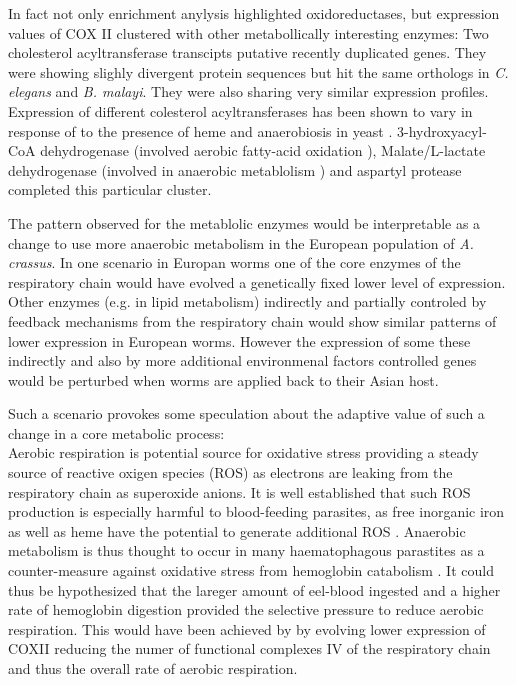 In fact not only enrichment anylysis highlighted oxidoreductases, but
expression values of COX II clustered with other metabollically
interesting enzymes: Two cholesterol acyltransferase transcipts
putative recently duplicated genes. They were showing slighly
divergent protein sequences but hit the same orthologs in
\textit{C. elegans} and \textit{B. malayi}. They were also sharing
very similar expression profiles. Expression of different colesterol
acyltransferases has been shown to vary in response of to the presence
of heme and anaerobiosis in yeast
\cite{pmid11786267}. 3-hydroxyacyl-CoA dehydrogenase (involved aerobic
fatty-acid oxidation \cite{pmid8454629}), Malate/L-lactate
dehydrogenase (involved in anaerobic metablolism
\cite{sturm1969vergleichende}) and aspartyl protease completed this
particular cluster.

The pattern observed for the metablolic enzymes would be interpretable
as a change to use more anaerobic metabolism in the European
population of \textit{A. crassus}. In one scenario in Europan worms
one of the core enzymes of the respiratory chain would have evolved a
genetically fixed lower level of expression. Other enzymes (e.g. in
lipid metabolism) indirectly and partially controled by feedback
mechanisms from the respiratory chain would show similar patterns of
lower expression in European worms. However the expression of some
these indirectly and also by more additional environmenal factors
controlled genes would be perturbed when worms are applied back to
their Asian host.


Such a scenario provokes some speculation about the adaptive value of
such a change in a core metabolic process:\\
Aerobic respiration is potential source for oxidative stress providing
a steady source of reactive oxigen species (ROS) as electrons are
leaking from the respiratory chain as superoxide anions. It is well
established that such ROS production is especially harmful to
blood-feeding parasites, as free inorganic iron as well as heme have
the potential to generate additional ROS
\cite{pmid21087517}. Anaerobic metabolism is thus thought to occur in
many haematophagous parastites as a counter-measure against oxidative
stress from hemoglobin catabolism \cite{pmid12163151}. It could thus
be hypothesized that the lareger amount of eel-blood ingested and a
higher rate of hemoglobin digestion provided the selective pressure to
reduce aerobic respiration. This would have been achieved by by
evolving lower expression of COXII reducing the numer of functional
complexes IV of the respiratory chain and thus the overall rate of
aerobic respiration.

